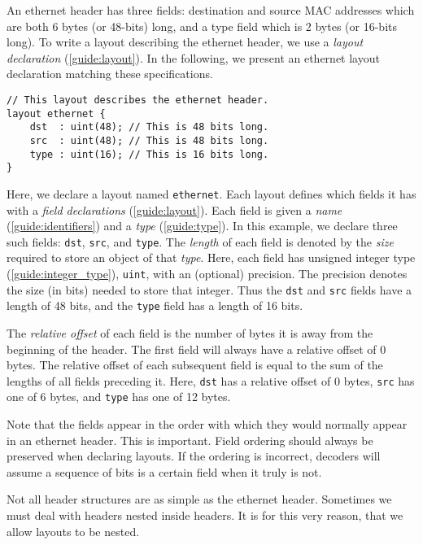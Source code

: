 An ethernet header has three fields: destination and source MAC addresses which are both 6 bytes (or 48-bits) long, and a type field which is 2 bytes (or 16-bits long). To write a layout describing the ethernet header, we use a \textit{layout declaration} (\ref{guide:layout}). In the following, we present an ethernet layout declaration matching these specifications.

\begin{codepage}
\begin{lstlisting}
// This layout describes the ethernet header.
layout ethernet {
	dst  : uint(48); // This is 48 bits long.
	src  : uint(48); // This is 48 bits long.
	type : uint(16); // This is 16 bits long.
}
\end{lstlisting}
\end{codepage}

Here, we declare a layout named \texttt{ethernet}. Each layout defines which fields it has with a \textit{field declarations} (\ref{guide:layout}). Each field is given a \textit{name} (\ref{guide:identifiers}) and a \textit{type} (\ref{guide:type}). In this example, we declare three such fields: \texttt{dst}, \texttt{src}, and \texttt{type}. The \textit{length} of each field is denoted by the \textit{size} required to store an object of that \textit{type}. Here, each field has unsigned integer type (\ref{guide:integer_type}), \texttt{uint}, with an (optional) precision. The precision denotes the size (in bits) needed to store that integer. Thus the \texttt{dst} and \texttt{src} fields have a length of 48 bits, and the \texttt{type} field has a length of 16 bits.

The \textit{relative offset} of each field is the number of bytes it is away from the beginning of the header. The first field will always have a relative offset of 0 bytes. The relative offset of each subsequent field is equal to the sum of the lengths of all fields preceding it. Here, \texttt{dst} has a relative offset of 0 bytes, \texttt{src} has one of 6 bytes, and \texttt{type} has one of 12 bytes.

Note that the fields appear in the order with which they would normally appear in an ethernet header. This is important. Field ordering should always be preserved when declaring layouts. If the ordering is incorrect, decoders will assume a sequence of bits is a certain field when it truly is not.

Not all header structures are as simple as the ethernet header. Sometimes we must deal with headers nested inside headers. It is for this very reason, that we allow layouts to be nested.


